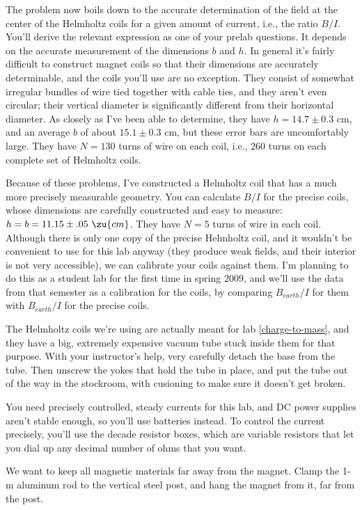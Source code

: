 The problem now boils down to the accurate determination of the field at the center of the Helmholtz coils
for a given amount of current, i.e., the ratio $B/I$. You'll derive the relevant expression as one of your prelab questions.
It depends on the accurate measurement of the dimensions $b$ and $h$. In general it's fairly difficult to
construct magnet coils so that their dimensions are accurately determinable, and the coils you'll use are no
exception. They consist of somewhat irregular bundles of wire tied together with cable ties, and they
aren't even circular; their vertical diameter is significantly different from their horizontal diameter.
As closely as I've been able to determine, they have $h=14.7\pm0.3$ cm, and an average $b$ of about $15.1\pm0.3$ cm,
but these error bars are uncomfortably large. They have $N=130$ turns of wire on each coil, i.e., 260 turns
on each complete set of Helmholtz coils.

Because of these problems, I've constructed a Helm\-holtz coil that has a much more precisely
measurable geometry. You can calculate $B/I$ for the precise coils, whose dimensions are
carefully constructed and easy to measure: $h=b=11.15\pm.05\ \zu{cm}$. They have $N=5$ turns of wire
in each coil.
Although there is only one copy of the precise Helmholtz coil, and it wouldn't
be convenient to use for this lab anyway (they produce weak fields, and their interior is not very
accessible), we can calibrate your coils against them. I'm planning to do this as a student lab for
the first time in spring 2009, and we'll use the data from that semester as a calibration for the coils,
by comparing $B_{earth}/I$ for them with  $B_{earth}/I$ for the precise coils.

The Helmholtz coils we're using are actually meant for lab \ref{charge-to-mass}, and they have a big,
extremely expensive vacuum tube stuck inside them for that purpose. With your instructor's help,
very carefully detach the base from the tube. Then unscrew the yokes that hold the tube in place, and
put the tube out of the way in the stockroom, with cusioning to make sure it doesn't get broken.

You need precisely controlled, steady currents for this lab, and DC power supplies aren't stable enough,
so you'll use batteries instead. To control the current precisely, you'll use the decade resistor
boxes, which are variable resistors that let you dial up any decimal number of ohms that you want.

We want to keep all magnetic materials far away from the magnet.
Clamp the 1-m aluminum rod to the vertical steel post, and hang the magnet from it, far from the post.

